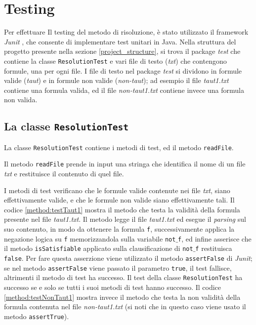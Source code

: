 \documentclass[a4paper,12pt]{report}
\begin{document}
\chapter{Testing}
\label{testing}
Per effettuare Il testing del metodo di risoluzione, è stato utilizzato il framework \emph{Junit} \cite{junit5}, che consente di implementare test unitari in Java. Nella struttura del progetto presente nella sezione \ref{project_structure}, si trova il package \emph{test} che contiene la classe \texttt{ResolutionTest} e vari file di testo (\emph{txt}) che contengono formule, una per ogni file. I file di testo nel package \emph{test} si dividono in formule valide (\emph{taut}) e in formule non valide (\emph{non-taut}); ad esempio il file \emph{taut1.txt} contiene una formula valida, ed il file \emph{non-taut1.txt} contiene invece una formula non valida.

\section{La classe \texttt{ResolutionTest}}
La classe \texttt{ResolutionTest} contiene i metodi di test, ed il metodo \texttt{readFile}.

Il metodo \texttt{readFile} prende in input una stringa che identifica il nome di un file \emph{txt} e restituisce il contenuto di quel file.

I metodi di test verificano che le formule valide contenute nei file \emph{txt}, siano effettivamente valide, e che le formule non valide siano effettivamente tali. Il codice \ref{method:testTaut1} mostra il metodo che testa la validità della formula presente nel file \emph{taut1.txt}. Il metodo legge il file \emph{taut1.txt} ed esegue il \emph{parsing} sul suo contenuto, in modo da ottenere la formula \texttt{f}, successivamente applica la negazione logica su \texttt{f} memorizzandola sulla variabile \texttt{not$\_$f}, ed infine asserisce che il metodo \texttt{isSatisfiable} applicato sulla clausificazione di \texttt{not$\_$f} restituisca \texttt{false}. Per fare questa asserzione viene utilizzato il metodo \texttt{assertFalse} di \emph{Junit}; se nel metodo \texttt{assertFalse} viene passato il parametro \texttt{true}, il test fallisce, altrimenti il metodo di test ha successo. Il test della classe \texttt{ResolutionTest} ha successo se e solo se tutti i suoi metodi di test hanno successo. Il codice \ref{method:testNonTaut1} mostra invece il metodo che testa la non validità della formula contenuta nel file \emph{non-taut1.txt} (si noti che in questo caso viene usato il metodo \texttt{assertTrue}).
\end{document}
